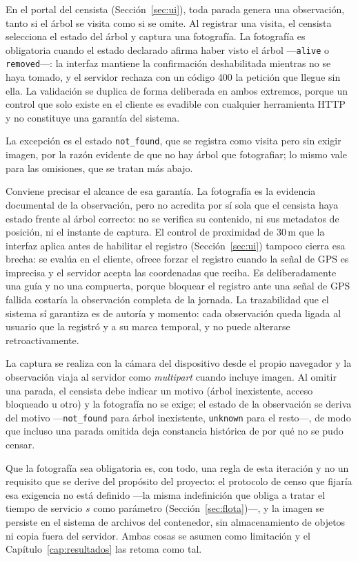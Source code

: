 En el portal del censista (Sección~\ref{sec:ui}), toda parada genera una observación, tanto si el
árbol se visita como si se omite. Al registrar una visita, el censista selecciona el estado del
árbol y captura una fotografía. La fotografía es obligatoria cuando el estado declarado afirma haber
visto el árbol ---\texttt{alive} o \texttt{removed}---: la interfaz mantiene la confirmación
deshabilitada mientras no se haya tomado, y el servidor rechaza con un código 400 la petición que
llegue sin ella. La validación se duplica de forma deliberada en ambos extremos, porque un control
que solo existe en el cliente es evadible con cualquier herramienta HTTP y no constituye una
garantía del sistema. 

La excepción es el estado \texttt{not\_found}, que se registra como visita pero sin exigir imagen,
por la razón evidente de que no hay árbol que fotografiar; lo mismo vale para las omisiones, que se
tratan más abajo.

Conviene precisar el alcance de esa garantía. La fotografía es la evidencia documental de la
observación, pero no acredita por sí sola que el censista haya estado frente al árbol correcto: no
se verifica su contenido, ni sus metadatos de posición, ni el instante de captura. El control de
proximidad de $30$\,m que la interfaz aplica antes de habilitar el registro (Sección~\ref{sec:ui})
tampoco cierra esa brecha: se evalúa en el cliente, ofrece forzar el registro cuando la señal de
GPS es imprecisa y el servidor acepta las coordenadas que reciba. Es deliberadamente una guía y no
una compuerta, porque bloquear el registro ante una señal de GPS fallida costaría la observación
completa de la jornada. La trazabilidad que el sistema sí garantiza es de autoría y momento: cada
observación queda ligada al usuario que la registró y a su marca temporal, y no puede alterarse
retroactivamente.

La captura se realiza con la cámara del dispositivo desde el propio navegador y la observación
viaja al servidor como \textit{multipart} cuando incluye imagen. Al omitir una parada, el censista
debe indicar un motivo (árbol inexistente, acceso bloqueado u otro) y la fotografía no se exige; el
estado de la observación se deriva del motivo ---\texttt{not\_found} para árbol inexistente,
\texttt{unknown} para el resto---, de modo que incluso una parada omitida deja constancia histórica
de por qué no se pudo censar.

Que la fotografía sea obligatoria es, con todo, una regla de esta iteración y no un requisito que
se derive del propósito del proyecto: el protocolo de censo que fijaría esa exigencia no está
definido ---la misma indefinición que obliga a tratar el tiempo de servicio $s$ como parámetro
(Sección~\ref{sec:flota})---, y la imagen se persiste en el sistema de archivos del contenedor, sin
almacenamiento de objetos ni copia fuera del servidor. Ambas cosas se asumen como limitación y el
Capítulo~\ref{cap:resultados} las retoma como tal.

